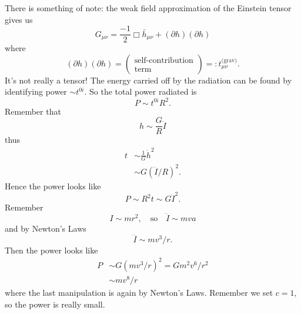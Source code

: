 There is something of note: the weak field approximation of the
Einstein tensor gives us
\begin{equation}
G_{\mu\nu} = \frac{-1}{2}\Box\bar{h}_{\mu\nu}+(\partial
h)(\partial h)
\end{equation}
where 
\begin{equation}
(\partial
h)(\partial h)
= \begin{pmatrix}\mbox{self-contribution}\\\mbox{term}
\end{pmatrix} =: t^{\text{(grav)}}_{\mu\nu}.
\end{equation}
It's not really a tensor! The energy carried off by the radiation
can be found by identifying power $\sim t^{0i}$. So the total
power radiated is 
\begin{equation}
P\sim t^{0i}R^{2}. 
\end{equation}
Remember that
\begin{equation}
h\sim \frac{G}{R}\ddot{I}
\end{equation}
thus
\begin{equation}
\begin{aligned}
t&\sim\frac{1}{G}\dot{h}^{2}\\
&\sim G(\dddot{I}/R)^{2}.
\end{aligned}
\end{equation}
Hence the power looks like
\begin{equation}
P\sim R^{2}t\sim G\dddot{I}^{2}.
\end{equation}
Remember
\begin{equation}
I\sim mr^{2},\quad\mbox{so}\quad
\dddot{I}\sim mva
\end{equation}
and by Newton's Laws
\begin{equation}
\dddot{I}\sim mv^{3}/r.
\end{equation}
Then the power looks like
\begin{equation}
\begin{aligned}
P & \sim G(mv^{3}/r)^{2}=Gm^{2}v^{6}/r^{2}\\
&\sim mv^{8}/r
\end{aligned}
\end{equation}
where the last manipulation is again by Newton's Laws. Remember
we set $c=1$, so the power is really small.


